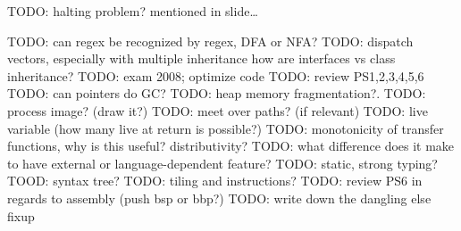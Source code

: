 TODO: halting problem? mentioned in slide\dots

TODO: can regex be recognized by regex, DFA or NFA?
TODO: dispatch vectors, especially with multiple inheritance
    how are interfaces vs class inheritance?
TODO: exam 2008; optimize code
TODO: review PS{1,2,3,4,5,6}
TODO: can pointers do GC?
TODO: heap memory fragmentation?.
TODO: process image? (draw it?)
TODO: meet over paths? (if relevant)
TODO: live variable (how many live at return is possible?)
TODO: monotonicity of transfer functions, why is this useful?
    distributivity?
TODO: what difference does it make to have external or language-dependent feature?
TODO: static, strong typing?
TOOD: syntax tree?
TODO: tiling and instructions?
TODO: review PS6 in regards to assembly (push bsp or bbp?)
TODO: write down the dangling else fixup

